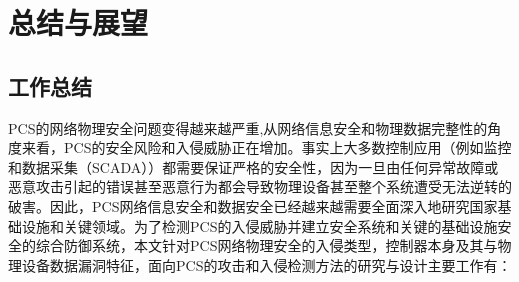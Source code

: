 


\chapter{总结与展望}    

\section{工作总结} 

PCS的网络物理安全问题变得越来越严重,从网络信息安全和物理数据完整性的角度来看，PCS的安全风险和入侵威胁正在增加。事实上大多数控制应用（例如监控和数据采集（SCADA））都需要保证严格的安全性，因为一旦由任何异常故障或恶意攻击引起的错误甚至恶意行为都会导致物理设备甚至整个系统遭受无法逆转的破害。因此，PCS网络信息安全和数据安全已经越来越需要全面深入地研究国家基础设施和关键领域。为了检测PCS的入侵威胁并建立安全系统和关键的基础设施安全的综合防御系统，本文针对PCS网络物理安全的入侵类型，控制器本身及其与物理设备数据漏洞特征，面向PCS的攻击和入侵检测方法的研究与设计主要工作有：
